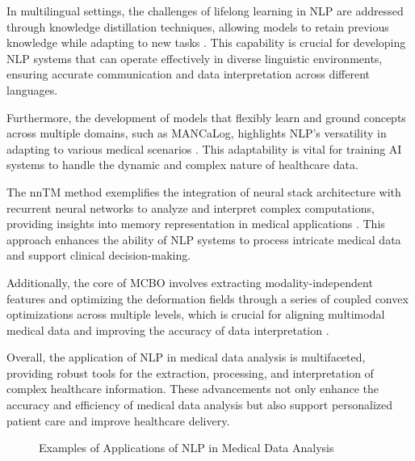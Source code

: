 In multilingual settings, the challenges of lifelong learning in NLP are addressed through knowledge distillation techniques, allowing models to retain previous knowledge while adapting to new tasks \cite{zhao2022lifelonglearningmultilingualneural}. This capability is crucial for developing NLP systems that can operate effectively in diverse linguistic environments, ensuring accurate communication and data interpretation across different languages.



Furthermore, the development of models that flexibly learn and ground concepts across multiple domains, such as MANCaLog, highlights NLP's versatility in adapting to various medical scenarios \cite{shakarian2022reasoningcomplexnetworkslogic}. This adaptability is vital for training AI systems to handle the dynamic and complex nature of healthcare data.



The nnTM method exemplifies the integration of neural stack architecture with recurrent neural networks to analyze and interpret complex computations, providing insights into memory representation in medical applications \cite{stogin2022provablystableneuralnetwork}. This approach enhances the ability of NLP systems to process intricate medical data and support clinical decision-making.



Additionally, the core of MCBO involves extracting modality-independent features and optimizing the deformation fields through a series of coupled convex optimizations across multiple levels, which is crucial for aligning multimodal medical data and improving the accuracy of data interpretation \cite{wang2024unsupervisedmultimodal3dmedical}.



Overall, the application of NLP in medical data analysis is multifaceted, providing robust tools for the extraction, processing, and interpretation of complex healthcare information. These advancements not only enhance the accuracy and efficiency of medical data analysis but also support personalized patient care and improve healthcare delivery.






{
\begin{figure}[ht!]
\centering
{}\hspace{0.03\textwidth}
\hspace{0.03\textwidth}
\caption{Examples of Applications of NLP in Medical Data Analysis}\label{fig:retrieve_fig_1}
\end{figure}
}


